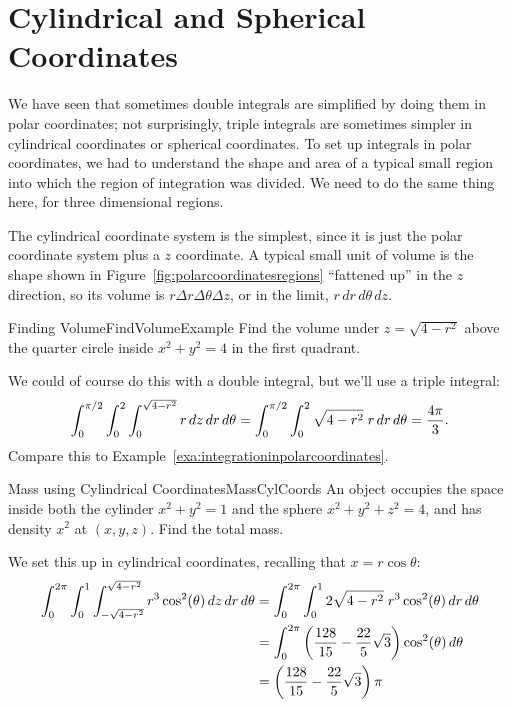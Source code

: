 \section{Cylindrical and Spherical Coordinates}\label{sec:CylSphCoords}

We have seen that sometimes double integrals are simplified by doing
them in polar coordinates; not surprisingly, triple integrals are
sometimes simpler in cylindrical coordinates or spherical coordinates.
To set up integrals in polar coordinates, we had to understand the
shape and area of a typical small region into which the region of
integration was divided. We need to do the same thing here, for three
dimensional regions.

The cylindrical coordinate system is the simplest, since it is just
the polar coordinate system plus a $z$ coordinate. A typical small
unit of volume is the shape shown in Figure~\ref{fig:polarcoordinatesregions}
``fattened up'' in the $z$ direction, so its
volume is $r\Delta r\Delta \theta\Delta z$, or in the limit, 
$r\,dr\,d\theta\,dz$. 

\begin{example}{Finding Volume}{FindVolumeExample}
Find the volume under $z=\sqrt{4-r^2}$ 
above the quarter circle inside $x^2+y^2=4$
in the first quadrant.
\end{example}
\begin{solution}
We could of course do this with a double integral, but we'll use a
triple integral:
$$\int_0^{\pi/2}\int_0^2\int_0^{\sqrt{4-r^2}} r\,dz\,dr\,d\theta=
\int_0^{\pi/2}\int_0^2 \sqrt{4-r^2}\; r\,dr\,d\theta=
{4\pi\over3}.$$
Compare this to Example~\ref{exa:integrationinpolarcoordinates}.
\end{solution}

\begin{example}{Mass using Cylindrical Coordinates}{MassCylCoords}
An object occupies the space inside both the cylinder
$x^2+y^2=1$ and the sphere $x^2+y^2+z^2=4$, and has density $x^2$ at
$(x,y,z)$. Find the total mass.
\end{example}
\begin{solution}
We set this up in cylindrical coordinates, recalling that
$x=r\cos\theta$: 
\begin{align*}
\int_0^{2\pi}\int_0^1\int_{-\sqrt{4-r^2}}^{\sqrt{4-r^2}}
r^3\cos^2(\theta)\,dz\,dr\,d\theta
&=\int_0^{2\pi}\int_0^1 2\sqrt{4-r^2}\;r^3\cos^2(\theta)\,dr\,d\theta	\\
&=\int_0^{2\pi}\left({128\over15}-{22\over5}\sqrt3\right)\cos^2(\theta)\,d\theta	\\
&=\left({128\over15}-{22\over5}\sqrt3\right)\pi
\end{align*}
\end{solution}

